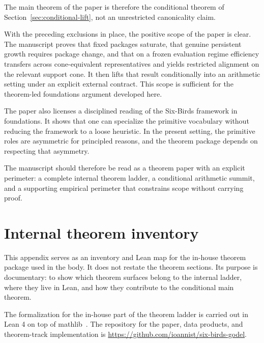\documentclass[11pt]{article}
\begin{document}
The main theorem of the paper is therefore the conditional theorem of Section~\ref{sec:conditional-lift}, not an unrestricted canonicality claim.

With the preceding exclusions in place, the positive scope of the paper is
clear. The manuscript proves that fixed packages saturate, that genuine
persistent growth requires package change, and that on a frozen evaluation
regime efficiency transfers across cone-equivalent representatives and yields
restricted alignment on the relevant support cone. It then lifts that result
conditionally into an arithmetic setting under an explicit external contract.
This scope is sufficient for the theorem-led foundations argument developed
here.

The paper also licenses a disciplined reading of the Six-Birds framework in
foundations. It shows that one can specialize the primitive vocabulary without
reducing the framework to a loose heuristic. In the present setting, the primitive roles
are asymmetric for principled reasons, and the theorem package depends on
respecting that asymmetry.

The manuscript should therefore be read as a theorem paper with an explicit
perimeter: a complete internal theorem ladder, a conditional arithmetic summit,
and a supporting empirical perimeter that constrains scope without carrying
proof.
 
\appendix
\section{Internal theorem inventory}\label{app:theorem-inventory}

This appendix serves as an inventory and Lean map for the in-house theorem package used in the body. It does not restate the theorem sections. Its purpose is documentary: to show which theorem surfaces belong to the internal ladder, where they live in Lean, and how they contribute to the conditional main theorem.

The formalization for the in-house part of the theorem ladder is carried out in Lean 4 on top of mathlib~\cite{deMouraUllrich2021,Mathlib2020}. The repository for the paper, data products, and theorem-track implementation is \url{https://github.com/ioannist/six-birds-godel}.
\end{document}

